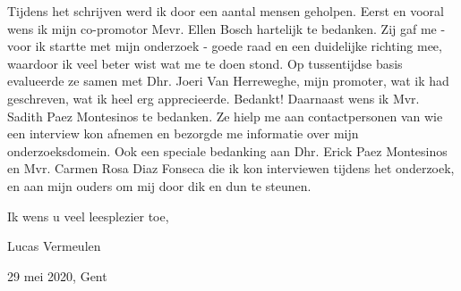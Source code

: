 Tijdens het schrijven werd ik door een aantal mensen geholpen. Eerst en vooral wens ik mijn co-promotor Mevr. Ellen Bosch hartelijk te bedanken. Zij gaf me - voor ik startte met mijn onderzoek - goede raad en een duidelijke richting mee, waardoor ik veel beter wist wat me te doen stond. Op tussentijdse basis evalueerde ze samen met Dhr. Joeri Van Herreweghe, mijn promoter, wat ik had geschreven, wat ik heel erg apprecieerde. Bedankt! Daarnaast wens ik Mvr. Sadith Paez Montesinos te bedanken. Ze hielp me aan contactpersonen van wie een interview kon afnemen en bezorgde me informatie over mijn onderzoeksdomein. Ook een speciale bedanking aan Dhr. Erick Paez Montesinos en Mvr. Carmen Rosa Diaz Fonseca die ik kon interviewen tijdens het onderzoek, en aan mijn ouders om mij door dik en dun te steunen.

Ik wens u veel leesplezier toe,

Lucas Vermeulen

29 mei 2020, Gent